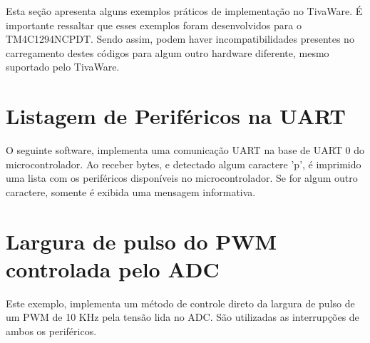 Esta seção apresenta alguns exemplos práticos de implementação no TivaWare. É importante ressaltar que esses exemplos foram desenvolvidos para o TM4C1294NCPDT. Sendo assim, podem haver incompatibilidades presentes no carregamento destes códigos para algum outro hardware diferente, mesmo suportado pelo TivaWare.

\minitocsection

\section{Listagem de Periféricos na UART}
\label{sec:exUart}
O seguinte software, implementa uma comunicação UART na base de UART 0 do microcontrolador. Ao receber bytes, e detectado algum caractere 'p', é imprimido uma lista com os periféricos disponíveis no microcontrolador. Se for algum outro caractere, somente é exibida uma mensagem informativa.



\section{Largura de pulso do PWM controlada pelo ADC}
\label{sec:exPwm}

Este exemplo, implementa um método de controle direto da largura de pulso de um PWM de 10 KHz  pela tensão lida no ADC. São utilizadas as interrupções de ambos os periféricos.


